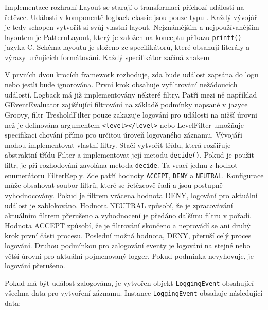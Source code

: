 \documentclass[ing,male,java,dept460]{diploma}		%
\begin{document}
\par Implementace rozhraní Layout se starají o transformaci příchozí události na řetězec. Události v komponentě logback-classic jsou pouze typu . Každý vývojář je tedy schopen vytvořit si svůj vlastní layout. Nejznámějším a nejpoužívanějším layoutem je PatternLayout, který je založen na konceptu příkazu \texttt{printf()} jazyka C. Schéma layoutu je složeno ze specifikátorů, které obsahují literály a výrazy určujících formátování. Každý specifikátor začíná znakem %
\par V prvních dvou krocích framework rozhoduje, zda bude událost zapsána do logu nebo jestli bude ignorována. První krok obsahuje vyfiltrování nežádoucích událostí. Logback má již implementovány některé filtry. Patří mezi ně například GEventEvaluator zajišťující filtrování na základě podmínky napsané v jazyce Groovy, filtr TresholdFilter pouze zakazuje logování pro události na nižší úrovni než je definována argumentem \texttt{<level></level>} nebo LevelFilter umožňuje specifikaci chování přímo pro určitou úroveň logovaného záznamu. Vývojáři mohou implementovat vlastní filtry. Stačí vytvořit třídu, která rozšiřuje abstraktní třídu Filter a implementovat její metodu \texttt{decide()}. Pokud je použit filtr, je při rozhodování zavolána metoda \texttt{decide}. Ta vrací jednu z hodnot enumerátoru FilterReply. Zde patří hodnoty \texttt{ACCEPT}, \texttt{DENY} a \texttt{NEUTRAL}. Konfigurace může obsahovat soubor filtrů, které se řetězcově řadí a jsou postupně vyhodnocovány. Pokud je filtrem vrácena hodnota DENY, logování pro aktuální událost je zablokováno. Hodnota NEUTRAL způsobí, že je zpracovávání aktuálním filtrem přerušeno a vyhodnocení je předáno dalšímu filtru v pořadí. Hodnota ACCEPT způsobí, že je filtrování skončeno a neprovádí se ani druhý krok první části procesu. Poslední možná hodnota, DENY, přeruší celý proces logování. Druhou podmínkou pro zalogování eventy je logování na stejné nebo větší úrovni pro aktuální pojmenovaný logger. Pokud podmínka nevyhovuje, je logování přerušeno.
\par Pokud má být událost zalogována, je vytvořen objekt \texttt{LoggingEvent} obsahující všechna data pro vytvoření záznamu. Instance \texttt{LoggingEvent} obsahuje následující data:
\end{document}
